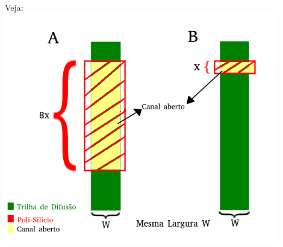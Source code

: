 \documentclass[12pt]{article}
\begin{document}
\begin{itemize}
			Veja:
			\hfill \\
			\includegraphics[width=12cm]{questao_4.png}
	\end{itemize}
\end{document}
